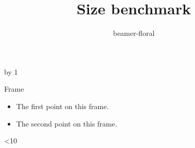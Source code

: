 \documentclass[aspectratio=169]{beamer}
\title{Size benchmark}\author{beamer-floral}\date{}
\newcommand\benchmarkframes{%
  \advance\benchmarkframe by 1
  \begin{frame}{Frame \the\benchmarkframe}
    \begin{itemize}
      \item The first point on this frame.\pause
      \item The second point on this frame.
    \end{itemize}
  \end{frame}
  \ifnum\benchmarkframe<10 \expandafter\benchmarkframes\fi}
\begin{document}
\begin{frame}[plain]\titlepage\end{frame}
\benchmarkframes
\end{document}
